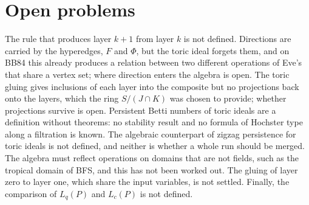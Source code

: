 \documentclass[11pt,a4paper]{article}
\begin{document}
\section{Open problems}\label{sec:open}

The rule that produces layer $k+1$ from layer $k$ is not defined. Directions are carried by the hyperedges, $F$ and $\Phi$, but the toric ideal forgets them, and on BB84 this already produces a relation between two different operations of Eve's that share a vertex set; where direction enters the algebra is open. The toric gluing gives inclusions of each layer into the composite but no projections back onto the layers, which the ring $S/(J\cap K)$ was chosen to provide; whether projections survive is open. Persistent Betti numbers of toric ideals are a definition without theorems: no stability result and no formula of Hochster type along a filtration is known. The algebraic counterpart of zigzag persistence for toric ideals is not defined, and neither is whether a whole run should be merged. The algebra must reflect operations on domains that are not fields, such as the tropical domain of BFS, and this has not been worked out. The gluing of layer zero to layer one, which share the input variables, is not settled. Finally, the comparison of $L_q(P)$ and $L_c(P)$ is not defined.
\end{document}
